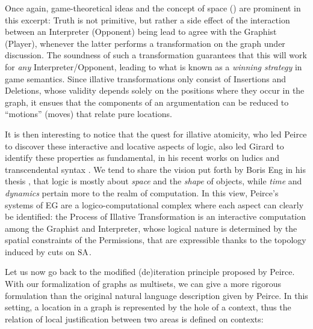 Once again, game-theoretical ideas and the concept of space
() are prominent in this excerpt: Truth is not primitive,
but rather a side effect of the interaction between an Interpreter (Opponent)
being lead to agree with the Graphist (Player), whenever the latter performs a
transformation on the graph under discussion. The soundness of such a
transformation guarantees that this will work for \emph{any}
Interpreter/Opponent, leading to what is known as a \emph{winning strategy} in
game semantics. Since illative transformations only consist of Insertions and
Deletions, whose validity depends solely on the positions where they occur in
the graph, it ensues that the components of an argumentation can be reduced to
``motions'' (moves) that relate pure locations.

It is then interesting to notice that the quest for illative atomicity, who led
Peirce to discover these interactive and locative aspects of logic, also led
Girard to identify these properties as fundamental, in his recent works on
ludics \cite{girard_locus_2001} and transcendental syntax
\cite{eng_exegesis_2023}. We tend to share the vision put forth by Boris Eng in
his thesis \cite[\S 24.4]{eng_exegesis_2023}, that logic is mostly about
\emph{space} and the \emph{shape} of objects, while \emph{time} and
\emph{dynamics} pertain more to the realm of computation. In this view, Peirce's
systems of EG are a logico-computational complex where each aspect can clearly
be identified: the Process of Illative Transformation is an interactive
computation among the Graphist and Interpreter, whose logical nature is
determined by the spatial constraints of the Permissions, that are expressible
thanks to the topology induced by cuts on $\small\textsc{SA}$.

Let us now go back to the modified (de)iteration principle proposed by Peirce.
With our formalization of graphs as multisets, we can give a more rigorous
formulation than the original natural language description given by
Peirce. In this setting, a location in a graph is represented by the
hole of a context, thus the relation of local justification between two areas is
defined on contexts:

